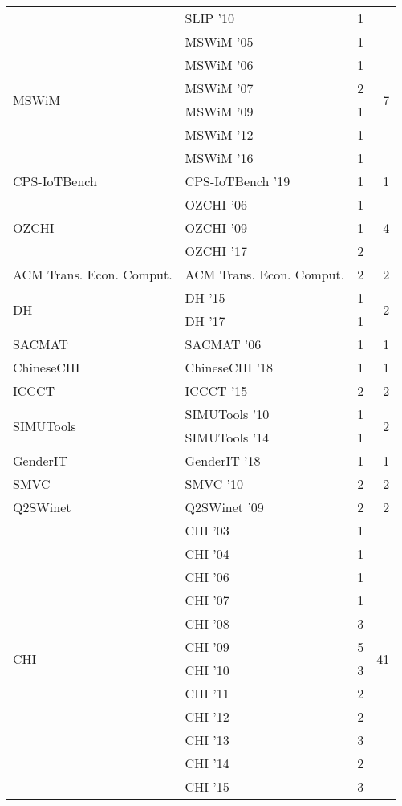 \begin{table*}[t]
\begin{tabular}{llrr}
& SLIP '10 & 1 &\\
\multirow{6}{*}{MSWiM } & MSWiM '05 & 1 & \multirow{6}{*}{7}\\
& MSWiM '06 & 1 &\\
& MSWiM '07 & 2 &\\
& MSWiM '09 & 1 &\\
& MSWiM '12 & 1 &\\
& MSWiM '16 & 1 &\\
\multirow{1}{*}{CPS-IoTBench } & CPS-IoTBench '19 & 1 & \multirow{1}{*}{1}\\
\multirow{3}{*}{OZCHI } & OZCHI '06 & 1 & \multirow{3}{*}{4}\\
& OZCHI '09 & 1 &\\
& OZCHI '17 & 2 &\\
\multirow{1}{*}{ACM Trans. Econ. Comput.} & ACM Trans. Econ. Comput. & 2 & \multirow{1}{*}{2}\\
\multirow{2}{*}{DH } & DH '15 & 1 & \multirow{2}{*}{2}\\
& DH '17 & 1 &\\
\multirow{1}{*}{SACMAT } & SACMAT '06 & 1 & \multirow{1}{*}{1}\\
\multirow{1}{*}{ChineseCHI } & ChineseCHI '18 & 1 & \multirow{1}{*}{1}\\
\multirow{1}{*}{ICCCT } & ICCCT '15 & 2 & \multirow{1}{*}{2}\\
\multirow{2}{*}{SIMUTools } & SIMUTools '10 & 1 & \multirow{2}{*}{2}\\
& SIMUTools '14 & 1 &\\
\multirow{1}{*}{GenderIT } & GenderIT '18 & 1 & \multirow{1}{*}{1}\\
\multirow{1}{*}{SMVC } & SMVC '10 & 2 & \multirow{1}{*}{2}\\
\multirow{1}{*}{Q2SWinet } & Q2SWinet '09 & 2 & \multirow{1}{*}{2}\\
\multirow{17}{*}{CHI } & CHI '03 & 1 & \multirow{17}{*}{41}\\
& CHI '04 & 1 &\\
& CHI '06 & 1 &\\
& CHI '07 & 1 &\\
& CHI '08 & 3 &\\
& CHI '09 & 5 &\\
& CHI '10 & 3 &\\
& CHI '11 & 2 &\\
& CHI '12 & 2 &\\
& CHI '13 & 3 &\\
& CHI '14 & 2 &\\
& CHI '15 & 3 &\\

\end{tabular}
\end{table*}
